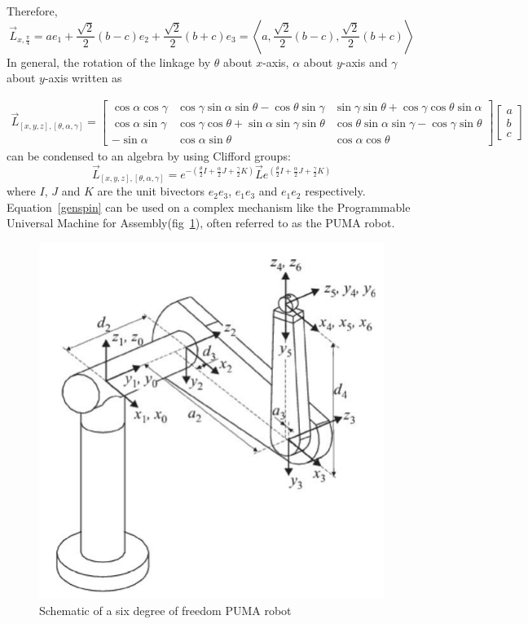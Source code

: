 \documentclass[12pt,onecolumn,letterpaper]{article} %
\begin{document}
Therefore,
\begin{equation*}
    \vec{L}_{x,\frac{\pi}{4}}=ae_1+\frac{\sqrt{2}}{2}(b-c)e_2+\frac{\sqrt{2}}{2}(b+c)e_3=\left\langle a, \frac{\sqrt{2}}{2}(b-c), \frac{\sqrt{2}}{2}(b+c)\right\rangle
\end{equation*}
In general, the rotation of the linkage by $\theta$ about $x$-axis, $\alpha$ about $y$-axis  and $\gamma$ about $y$-axis written as
 
\begin{align*}
\vec{L}_{[x,y,z],[\theta,\alpha,\gamma]}=
\left [
\begin{array}{llr}
\cos\alpha \cos\gamma & \cos\gamma\sin\alpha\sin\theta-\cos\theta\sin\gamma & \sin\gamma\sin\theta+\cos\gamma\cos\theta\sin\alpha \\
\cos\alpha\sin\gamma & \cos\gamma\cos\theta+\sin\alpha\sin\gamma\sin\theta  & \cos\theta\sin\alpha\sin\gamma-\cos\gamma\sin\theta \\
-\sin\alpha & \cos\alpha\sin\theta & \cos\alpha\cos\theta
\end{array} \right]\left [
\begin{array}{l}
a  \\
b  \\
c
\end{array} \right]
\end{align*}
can be condensed to an algebra by using Clifford groups:
\begin{equation}
    \vec{L}_{[x,y,z],[\theta,\alpha,\gamma]}=e^{-\left(\frac{\theta}{2}I+\frac{\alpha}{2}J+\frac{\gamma}{2}K\right)}\vec{L}e^{\left(\frac{\theta}{2}I+\frac{\alpha}{2}J+\frac{\gamma}{2}K\right)}\label{genspin}
\end{equation}
where $I$, $J$ and $K$ are the unit bivectors $e_2e_3$, $e_1e_3$ and $e_1e_2$ respectively. \\
\indent Equation~\ref{genspin} can be used on a complex mechanism like the Programmable Universal Machine for Assembly(fig~\ref{pum}), often referred to as the PUMA robot.
\begin{figure}[h]
\centering \includegraphics[width=0.5\linewidth]{pum}\caption{Schematic of a six degree of freedom PUMA robot} \label{pum}
\end{figure}
\end{document}
